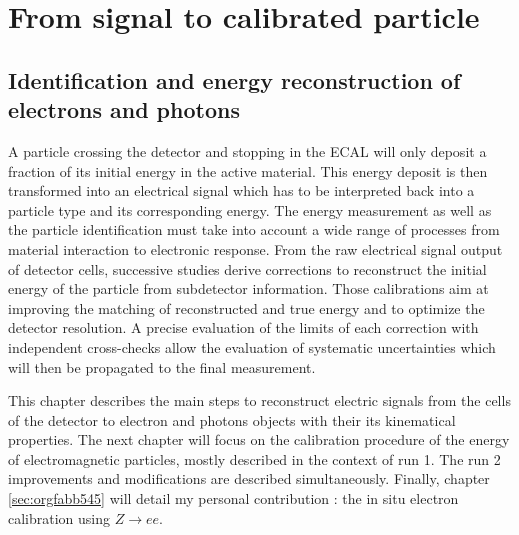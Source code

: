 \part{From signal to calibrated particle}
\label{sec:org4bab938}
\label{Calibration}



\chapter{Identification and energy reconstruction of electrons and photons}
\label{sec:org8a9e874}
\label{sec:RecoID}



A particle crossing the detector and stopping in the ECAL will only deposit a fraction of its  initial energy in the active material.
This energy deposit is then transformed into an electrical signal which has to be interpreted back into a particle type and its corresponding energy.
The energy measurement as well as the particle identification must take into account a wide range of processes from material interaction to electronic response.
From the raw electrical signal output of detector cells, successive studies derive corrections to reconstruct the initial energy of the particle from subdetector information.
Those calibrations aim at improving the matching of reconstructed and true energy and to optimize the detector resolution.
A precise evaluation of the limits of each correction with independent cross-checks allow the evaluation of systematic uncertainties which will then be propagated to the final measurement.

This chapter describes the main steps to reconstruct electric signals from the cells of the detector to electron and photons objects with their its kinematical properties.
The next chapter will focus on the calibration procedure of the energy of electromagnetic particles, mostly described in the context of run 1.
The run 2 improvements and modifications are described simultaneously.
Finally, chapter \ref{sec:orgfabb545} will detail my personal contribution : the in situ electron calibration using $Z\rightarrow ee$.

